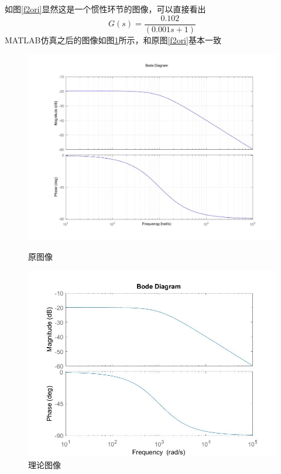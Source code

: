 \documentclass[UTF8,a4paper]{ctexart}
\begin{document}
\section{}
如图\ref{f2ori}显然这是一个惯性环节的图像，可以直接看出$$G(s)=\frac{0.102}{(0.001s+1)}$$MATLAB仿真之后的图像如图\ref{f2the}所示，和原图\ref{f2ori}基本一致
\begin{figure}
\centering
\includegraphics[width=\textwidth]{motorG1.jpg}
\caption{原图像}
\label{f2ori}
\includegraphics[width=\textwidth]{RmotorG1.jpg}
\caption{理论图像}
\label{f2the}
\end{figure}
\end{document}
